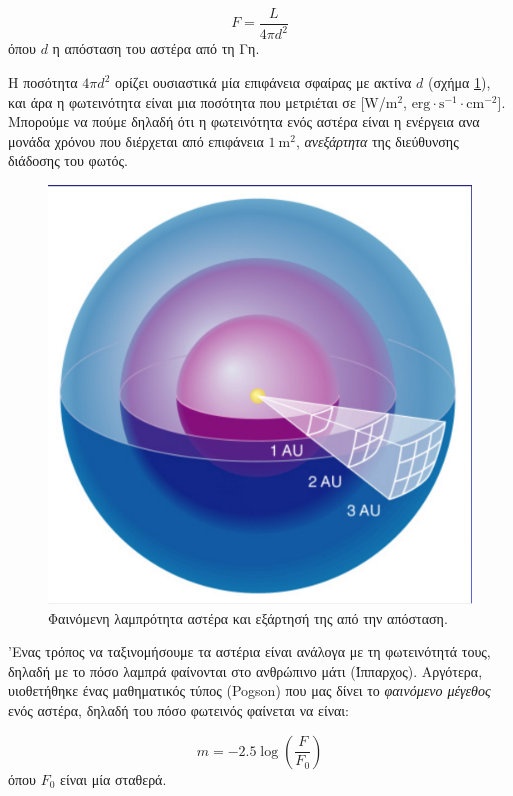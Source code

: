 \begin{equation}
    F = \frac{L}{4 \pi d^2}
\end{equation}
όπου $d$ η απόσταση του αστέρα από τη Γη.

Η ποσότητα $4 \pi d^2$ ορίζει ουσιαστικά μία επιφάνεια σφαίρας με ακτίνα $d$ (σχήμα \ref{fig:flux}), και άρα η φωτεινότητα είναι μια ποσότητα που μετριέται σε [W/$\text{m}^2$, $\text{erg} \cdot \text{s}^{-1} \cdot \text{cm}^{-2}$]. Μπορούμε να πούμε δηλαδή ότι η φωτεινότητα ενός αστέρα είναι η ενέργεια ανα μονάδα χρόνου που διέρχεται από επιφάνεια $1 \ \text{m}^2$, \textit{ανεξάρτητα} της διεύθυνσης διάδοσης του φωτός.

\begin{figure}[h]
    \centering
    \includegraphics[scale=0.3]{Figures/flux.png}
    \caption{Φαινόμενη λαμπρότητα αστέρα και εξάρτησή της από την απόσταση.}
    \label{fig:flux}
\end{figure}

'Ενας τρόπος να ταξινομήσουμε τα αστέρια είναι ανάλογα με τη φωτεινότητά τους, δηλαδή με το πόσο λαμπρά φαίνονται στο ανθρώπινο μάτι (Ίππαρχος). Αργότερα, υιοθετήθηκε ένας μαθηματικός τύπος (Pogson) που μας δίνει το \textit{φαινόμενο μέγεθος} ενός αστέρα, δηλαδή του πόσο φωτεινός φαίνεται να είναι:

\begin{equation}
    \label{eq:apparent_magnitude}
    m = -2.5 \log \left ( \frac{F}{F_0} \right )
\end{equation}
όπου $F_0$ είναι μία σταθερά.

